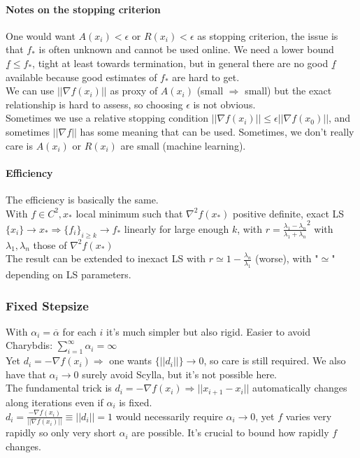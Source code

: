 \documentclass[10pt]{report}
\begin{document}
\paragraph{Notes on the stopping criterion} One would want $A(x_i)<\epsilon$ or $R(x_i) < \epsilon$ as stopping criterion, the issue is that $f_*$ is often unknown and cannot be used online. We need a lower bound $\underline{f} \leq f_*$, tight at least towards termination, but in general there are no good $\underline{f}$ available because good estimates of $f_*$ are hard to get.\\
We can use $||\nabla f(x_i)||$ as proxy of $A(x_i)$ (small $\Rightarrow$ small) but the exact relationship is hard to assess, so choosing $\epsilon$ is not obvious.\\
Sometimes we use a relative stopping condition $||\nabla f(x_i)||\leq \epsilon||\nabla f(x_0)||$, and sometimes $||\nabla f||$ has some meaning that can be used. Sometimes, we don't really care is $A(x_i)$ or $R(x_i)$ are small (machine learning).
\paragraph{Efficiency} The efficiency is basically the same.\\
With $f\in C^2, x_*$ local minimum such that $\nabla^2f(x_*)$ positive definite, exact LS $\{x_i\}\rightarrow x_* \Rightarrow \{f_i\}_{i\geq k}\rightarrow f_*$ linearly for large enough $k$, with $r = \frac{\lambda_1 - \lambda_n}{\lambda_1 + \lambda_n}^2$ with $\lambda_1,\lambda_n$ those of $\nabla^2 f(x_*)$\\
The result can be extended to inexact LS with $r\simeq 1-\frac{\lambda_n}{\lambda_1}$ (worse), with "$\simeq$" depending on LS parameters.
\subsubsection{Fixed Stepsize}
With $\alpha_i = \overline{\alpha}$ for each $i$ it's much simpler but also rigid. Easier to avoid Charybdis: $\sum_{i=1}^\infty \alpha_i = \infty$\\
Yet $d_i = -\nabla f(x_i) \Rightarrow$ one wants $\{||d_i||\}\rightarrow 0$, so care is still required. We also have that $\alpha_i\rightarrow 0$ surely avoid Scylla, but it's not possible here.\\
The fundamental trick is $d_i = -\nabla f(x_i) \Rightarrow ||x_{i+1} - x_i||$ automatically changes along iterations even if $\alpha_i$ is fixed.\\
$d_i = \frac{-\nabla f(x_i)}{||\nabla f(x_i)||} \equiv ||d_i|| = 1$ would necessarily require $\alpha_i \rightarrow 0$, yet $f$ varies very rapidly so only very short $\alpha_i$ are possible. It's crucial to bound how rapidly $f$ changes.
\end{document}
